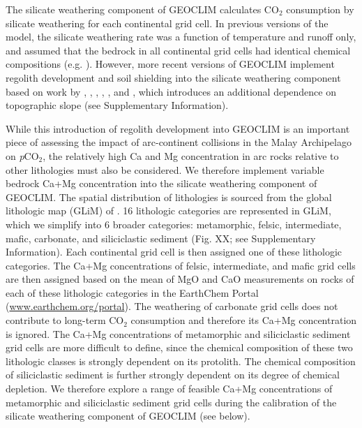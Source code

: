 \documentclass[11pt,letterpaper]{article}
\newcommand{\pCOtwo}{\textit{p}CO$_{2}$\xspace}
\newcommand{\COtwo}{CO$_{2}$\xspace}
\begin{document}
The silicate weathering component of GEOCLIM calculates \COtwo consumption by silicate weathering for each continental grid cell. In previous versions of the model, the silicate weathering rate was a function of temperature and runoff only, and assumed that the bedrock in all continental grid cells had identical chemical compositions (e.g. \citealp{Godderis2014a}). However, more recent versions of GEOCLIM implement regolith development and soil shielding into the silicate weathering component based on work by \citet{Heimsath1997a}, \citet{Gabet2009a}, \citet{West2012a}, \citet{Carretier2014a}, \citet{Godderis2017b}, and \citet{Maffre2018a}, which introduces an additional dependence on topographic slope (see Supplementary Information).

While this introduction of regolith development into GEOCLIM is an important piece of assessing the impact of arc-continent collisions in the Malay Archipelago on \pCOtwo, the relatively high Ca and Mg concentration in arc rocks relative to other lithologies must also be considered. We therefore implement variable bedrock Ca+Mg concentration into the silicate weathering component of GEOCLIM. The spatial distribution of lithologies is sourced from the global lithologic map (GLiM) of \citet{Hartmann2012a}. 16 lithologic categories are represented in GLiM, which we simplify into 6 broader categories: metamorphic, felsic, intermediate, mafic, carbonate, and siliciclastic sediment (Fig. XX; see Supplementary Information). Each continental grid cell is then assigned one of these lithologic categories. The Ca+Mg concentrations of felsic, intermediate, and mafic grid cells are then assigned based on the mean of MgO and CaO measurements on rocks of each of these lithologic categories in the EarthChem Portal (\url{www.earthchem.org/portal}). The weathering of carbonate grid cells does not contribute to long-term \COtwo consumption and therefore its Ca+Mg concentration is ignored. The Ca+Mg concentrations of metamorphic and siliciclastic sediment grid cells are more difficult to define, since the chemical composition of these two lithologic classes is strongly dependent on its protolith. The chemical composition of siliciclastic sediment is further strongly dependent on its degree of chemical depletion. We therefore explore a range of feasible Ca+Mg concentrations of metamorphic and siliciclastic sediment grid cells during the calibration of the silicate weathering component of GEOCLIM (see below).

\end{document}
